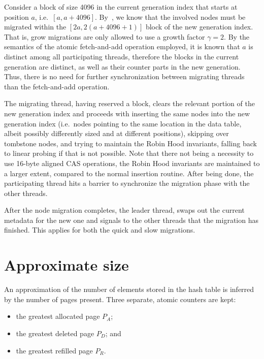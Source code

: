 Consider a block of size 4096 in the current generation index that starts at position $a$, i.e.\ $[a, a + 4096]$.
By~\cite[Lemma~5.1]{maier}, we know that the involved nodes must be migrated within the $[2a, 2(a + 4096 + 1)]$ block of the new generation index.
That is, grow migrations are only allowed to use a growth factor $\gamma = 2$.
By the semantics of the atomic fetch-and-add operation employed, it is known that $a$ is distinct among all participating threads, therefore the blocks in the current generation are distinct, as well as their counter parts in the new generation.
Thus, there is no need for further synchronization between migrating threads than the fetch-and-add operation.

The migrating thread, having reserved a block, clears the relevant portion of the new generation index and proceeds with inserting the same nodes into the new generation index (i.e.\ nodes pointing to the same location in the data table, albeit possibly differently sized and at different positions), skipping over tombstone nodes, and trying to maintain the Robin Hood invariants, falling back to linear probing if that is not possible.
Note that there not being a necessity to use 16-byte aligned CAS operations, the Robin Hood invariants are maintained to a larger extent, compared to the normal insertion routine.
After being done, the participating thread hits a barrier to synchronize the migration phase with the other threads.

After the node migration completes, the leader thread, swaps out the current metadata for the new one and signals to the other threads that the migration has finished.
This applies for both the quick and slow migrations.


\section{Approximate size}\label{sec:approximate-size}

An approximation of the number of elements stored in the hash table is inferred by the number of pages present.
Three separate, atomic counters are kept:

\begin{itemize}
    \item the greatest allocated page $P_A$;
    \item the greatest deleted page $P_D$; and
    \item the greatest refilled page $P_R$.
\end{itemize}


